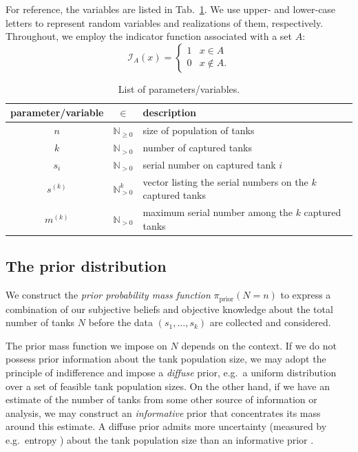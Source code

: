 \documentclass[11pt, oneside]{article}
\newcommand{\data}{$(s_1, ..., s_k)$\xspace}
\begin{document}
For reference, the variables are listed in Tab.~\ref{tab:params}. 
We use upper- and lower-case letters to represent random variables and realizations of them, respectively. 
Throughout, we employ the indicator function associated with a set $A$:
\begin{equation}
\mathcal{I}_{A}(x) = \begin{cases} 1 & x \in A \\ 0 & x \notin A . \end{cases} 
\end{equation}

\begin{table}[h!]
	\centering
	\caption{List of parameters/variables.} \label{tab:params}
	\begin{tabular}{c c l}
		\toprule
		parameter/variable & $\in$ & description \\
		\midrule
		$n$ & $\mathbb{N}_{\geq 0}$ & size of population of tanks \\
		$k$ & $\mathbb{N}_{>0}$ &  number of captured tanks \\
		$s_i$ & $\mathbb{N}_{>0}$ &  serial number on captured tank $i$ \\
		$s^{(k)}$ & $\mathbb{N}_{>0}^k$ & vector listing the serial numbers on the $k$ captured tanks \\
		$m^{(k)}$ & $\mathbb{N}_{>0}$ &  maximum serial number among the $k$ captured tanks \\
		\bottomrule
	\end{tabular}
\end{table}

\subsection{The prior distribution}
We construct the \emph{prior probability mass function} $\pi_{\text{prior}}(N=n)$ to express a combination of our subjective beliefs and objective knowledge about the total number of tanks $N$ before the data \data are collected and considered. 

The prior mass function we impose on $N$ depends on the context. 
If we do not possess prior information about the tank population size, we may adopt the principle of indifference and impose a \emph{diffuse} prior, e.g.\ a uniform distribution over a set of feasible tank population sizes. 
On the other hand, if we have an estimate of the number of tanks from some other source of information or analysis, we may construct an \emph{informative} prior that concentrates its mass around this estimate. 
A diffuse prior admits more uncertainty (measured by e.g.\ entropy \cite{murphy2022probabilistic}) about the tank population size than an informative prior \cite{van2021bayesian}.
\end{document}

